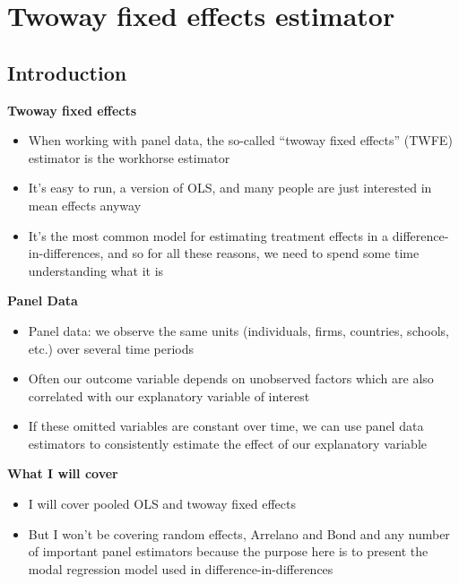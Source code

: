 \documentclass[notes=show]{beamer}
\begin{document}
\section{Twoway fixed effects estimator}

\subsection{Introduction}

\begin{frame}
\begin{center}
\textbf{Twoway fixed effects}
\end{center}

\begin{itemize}
\item When working with panel data, the so-called ``twoway fixed effects'' (TWFE) estimator is the workhorse estimator
\item It's easy to run, a version of OLS, and many people are just interested in mean effects anyway
\item It's the most common model for estimating treatment effects in a difference-in-differences, and so for all these reasons, we need to spend some time understanding what it is
\end{itemize}

\end{frame}


\begin{frame}[plain]
	\begin{center}
	\textbf{Panel Data}
	\end{center}
	
	\begin{itemize}
	\item Panel data: we observe the same units (individuals, firms, countries, schools, etc.) over several time periods
	\item Often our outcome variable depends on unobserved factors which are also correlated with our explanatory variable of interest
	\item If these omitted variables are constant over time, we can use panel data estimators to consistently estimate the effect of our explanatory variable
	\end{itemize}
\end{frame}

\begin{frame}[plain]
\begin{center}
\textbf{What I will cover}
\end{center}

\begin{itemize}
		\item I will cover pooled OLS and twoway fixed effects
		\item But I won't be covering random effects, Arrelano and Bond and any number of important panel estimators because the purpose here is to present the modal regression model used in difference-in-differences
\end{itemize}

\end{frame}
\end{document}
